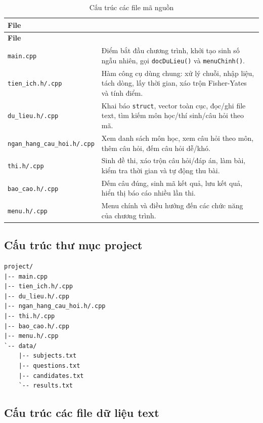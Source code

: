 \documentclass[12pt,a4paper]{report}
\newcommand{\codecell}[1]{\texttt{#1}}
\begin{document}
\begin{longtable}{|>{\centering\arraybackslash}m{}|>{\raggedright\arraybackslash}m{}|}
\caption{Cấu trúc các file mã nguồn}\label{tab:file-ma-nguon}\\
\hline
\textbf{File} & \multicolumn{1}{>{\centering\arraybackslash}m{0.60\textwidth}|}{\textbf{Vai trò}} \\
\hline
\endfirsthead
\hline
\textbf{File} & \multicolumn{1}{>{\centering\arraybackslash}m{0.60\textwidth}|}{\textbf{Vai trò}} \\
\hline
\endhead
\codecell{main.cpp} & Điểm bắt đầu chương trình, khởi tạo sinh số ngẫu nhiên, gọi \codecell{docDuLieu()} và \codecell{menuChinh()}. \\
\hline
\codecell{tien\_ich.h/.cpp} & Hàm công cụ dùng chung: xử lý chuỗi, nhập liệu, tách dòng, lấy thời gian, xáo trộn Fisher-Yates và tính điểm. \\
\hline
\codecell{du\_lieu.h/.cpp} & Khai báo \codecell{struct}, vector toàn cục, đọc/ghi file text, tìm kiếm môn học/thí sinh/câu hỏi theo mã. \\
\hline
\codecell{ngan\_hang\_cau\_hoi.h/.cpp} & Xem danh sách môn học, xem câu hỏi theo môn, thêm câu hỏi, đếm câu hỏi dễ/khó. \\
\hline
\codecell{thi.h/.cpp} & Sinh đề thi, xáo trộn câu hỏi/đáp án, làm bài, kiểm tra thời gian và tự động thu bài. \\
\hline
\codecell{bao\_cao.h/.cpp} & Đếm câu đúng, sinh mã kết quả, lưu kết quả, hiển thị báo cáo nhiều lần thi. \\
\hline
\codecell{menu.h/.cpp} & Menu chính và điều hướng đến các chức năng của chương trình. \\
\hline
\end{longtable}

\subsection{Cấu trúc thư mục project}

\begin{lstlisting}[caption={Cấu trúc thư mục project}]
project/
|-- main.cpp
|-- tien_ich.h/.cpp
|-- du_lieu.h/.cpp
|-- ngan_hang_cau_hoi.h/.cpp
|-- thi.h/.cpp
|-- bao_cao.h/.cpp
|-- menu.h/.cpp
`-- data/
    |-- subjects.txt
    |-- questions.txt
    |-- candidates.txt
    `-- results.txt
\end{lstlisting}

\subsection{Cấu trúc các file dữ liệu text}
\end{document}
